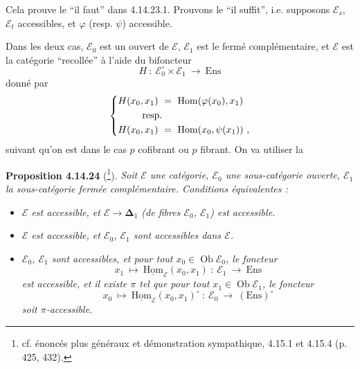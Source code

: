 \documentclass[11pt]{article}
\newcommand{\msp}[1]{\marginpar{\footnotesize [#1]}}
\newcommand{\Ob}{\operatorname{Ob}}
\newcommand{\Hom}{\operatorname{Hom}}
\newcommand{\uHom}{\underline{\mathrm{Hom}}}
\newcommand{\Ens}{\mathrm{Ens}}
\newcommand{\bDelta}{\boldsymbol{\Delta}}
\begin{document}
Cela prouve le “il faut” dans 4.14.23.1. Prouvons le “il suffit”, i.e. supposons $\mathcal{E}_s$, $\mathcal{E}_t$ accessibles, et $\varphi$ (resp. $\psi$) accessible.

\msp{page 413}

Dans les deux cas, $\mathcal{E}_0$ est un ouvert de $\mathcal{E}$, $\mathcal{E}_1$ est le fermé complémentaire, et $\mathcal{E}$ est la catégorie “recollée” à l'aide du bifoncteur
\[
H\ :\ \mathcal{E}_0^{\circ}\times\mathcal{E}_1\ \longrightarrow\ \Ens
\]
donné par
\[
\left\{
\begin{aligned}
H(x_0,x_1)\ &=\ \Hom(\varphi(x_0),x_1)\\
&\hspace{-2em}\text{resp.}\\
H(x_0,x_1)\ &=\ \Hom(x_0,\psi(x_1))\ ,
\end{aligned}
\right.
\]
suivant qu'on est dans le cas $p$ cofibrant ou $p$ fibrant. On va utiliser la

\textbf{Proposition 4.14.24} (\footnote[173]{cf. énoncés plus généraux et démonstration sympathique, 4.15.1 et 4.15.4 (p. 425, 432).}). \textit{Soit $\mathcal{E}$ une catégorie, $\mathcal{E}_0$ une sous-catégorie ouverte, $\mathcal{E}_1$ la sous-catégorie fermée complémentaire. Conditions équivalentes :}
\begin{itemize}[leftmargin=*]
\item[\textit{a)}] \textit{$\mathcal{E}$ est accessible, et $\mathcal{E}\longrightarrow\bDelta_1$ (de fibres $\mathcal{E}_0$, $\mathcal{E}_1$) est accessible.}
\item[\textit{b)}] \textit{$\mathcal{E}$ est accessible, et $\mathcal{E}_0$, $\mathcal{E}_1$ sont accessibles dans $\mathcal{E}$.}
\item[\textit{c)}] \textit{$\mathcal{E}_0$, $\mathcal{E}_1$ sont accessibles, et pour tout $x_0\in\Ob\mathcal{E}_0$, le foncteur}
\[
x_1\ \longmapsto\ \uHom_{\mathcal{E}}(x_0,x_1)\ :\ \mathcal{E}_1\ \longrightarrow\ \Ens
\]
\msp{page 414}
\textit{est accessible, et il existe $\pi$ tel que pour tout $x_1\in\Ob\mathcal{E}_1$, le foncteur}
\[
x_0\ \longmapsto\ \uHom_{\mathcal{E}}(x_0,x_1)^{\circ}\ :\ \mathcal{E}_0\ \longrightarrow\ (\Ens)^{\circ}
\]
\textit{soit $\pi$-accessible.}
\end{itemize}
\end{document}

